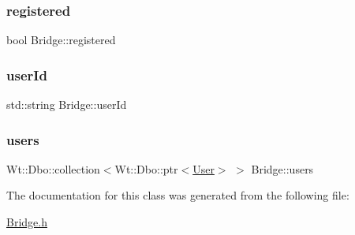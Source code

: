 \mbox{\label{class_bridge_aad587c8a2b91ebf99d45ad9960409041}} 
\subsubsection{\texorpdfstring{registered}{registered}}
{\footnotesize\ttfamily bool Bridge\+::registered\hspace{0.3cm}{\ttfamily [private]}}

\mbox{\label{class_bridge_a99b5742c2e826c016d6e1ed2fdb2f542}} 
\subsubsection{\texorpdfstring{user\+Id}{userId}}
{\footnotesize\ttfamily std\+::string Bridge\+::user\+Id\hspace{0.3cm}{\ttfamily [private]}}

\mbox{\label{class_bridge_a84dbab519260e2e4edd8d40803b1ceec}} 
\subsubsection{\texorpdfstring{users}{users}}
{\footnotesize\ttfamily Wt\+::\+Dbo\+::collection$<$Wt\+::\+Dbo\+::ptr$<$\hyperlink{class_user}{User}$>$ $>$ Bridge\+::users}



The documentation for this class was generated from the following file\+:\begin{DoxyCompactItemize}
\item 
\hyperlink{_bridge_8h}{Bridge.\+h}\end{DoxyCompactItemize}
